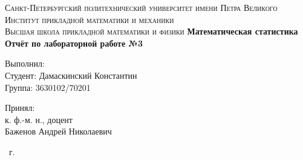 \documentclass[14pt,a4paper,article]{ncc}
\begin{document}
\begin{titlepage}
    \begin{center}
        \textsc{
            Санкт-Петербургский политехнический университет имени Петра Великого \\[5mm]
            Институт прикладной математики и механики\\[2mm]
            Высшая школа прикладной математики и физики            
        }   
        \vfill
        \textbf{\large
            Математическая статистика\\
            Отчёт по лабораторной работе №3 \\[3mm]
        }                
    \end{center}

    \vfill
    \hfill
    \begin{minipage}{0.5\textwidth}
        Выполнил: \\[2mm]   
		Студент: Дамаскинский Константин \\
		Группа: 3630102/70201\\
    \end{minipage}

	\hfill
	\begin{minipage}{0.5\textwidth}
		Принял: \\[2mm]
		к. ф.-м. н., доцент \\   
		Баженов Андрей Николаевич
	\end{minipage}

    \vfill
    \begin{center}
        \theyear\ г.
    \end{center}
\end{titlepage}

\tableofcontents
\listoffigures
\listoftables
\newpage

\end{document}
